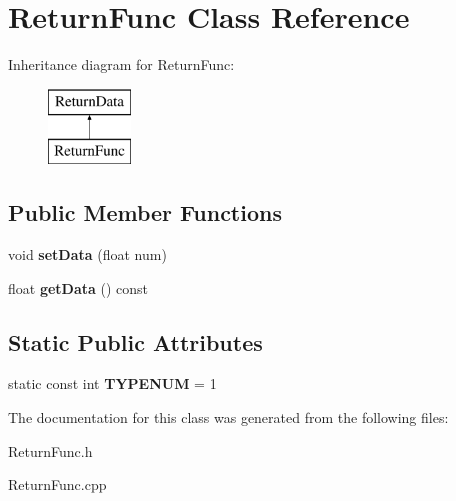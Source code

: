 \hypertarget{class_return_func}{\section{Return\-Func Class Reference}
\label{class_return_func}
}
Inheritance diagram for Return\-Func\-:\begin{figure}[H]
\begin{center}
\leavevmode
\includegraphics[height=2.000000cm]{class_return_func}
\end{center}
\end{figure}
\subsection*{Public Member Functions}
\begin{DoxyCompactItemize}
\item 
\hypertarget{class_return_func_acece0b291362fedc2ffb85260d7265ef}{void {\bfseries set\-Data} (float num)}\label{class_return_func_acece0b291362fedc2ffb85260d7265ef}

\item 
\hypertarget{class_return_func_a923b08b85b05c1884b2382b27b62a9c7}{float {\bfseries get\-Data} () const }\label{class_return_func_a923b08b85b05c1884b2382b27b62a9c7}

\end{DoxyCompactItemize}
\subsection*{Static Public Attributes}
\begin{DoxyCompactItemize}
\item 
\hypertarget{class_return_func_af1d2ac69deb830ac09527db1a0938a32}{static const int {\bfseries T\-Y\-P\-E\-N\-U\-M} = 1}\label{class_return_func_af1d2ac69deb830ac09527db1a0938a32}

\end{DoxyCompactItemize}


The documentation for this class was generated from the following files\-:\begin{DoxyCompactItemize}
\item 
Return\-Func.\-h\item 
Return\-Func.\-cpp\end{DoxyCompactItemize}
